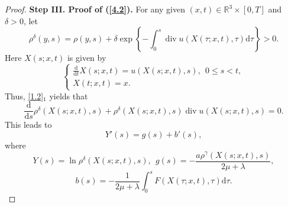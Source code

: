 \documentclass[11pt]{article}
\DeclareMathOperator{\divv}{div}
\begin{document}
\begin{proof}
{\bf Step III. Proof of (\ref{4.2}).}
For any given $(x,t) \in \mathbb{R}^3 \times [0,T]$ and $\delta>0$, let
$$
\rho^{\delta} (y,s) = \rho (y,s) + \delta \exp\left\{- \int^s_0 \divv u \left( X(\tau; x,t), \tau \right)\mathrm{d} \tau \right\} > 0.
$$
Here $X(s;x,t)$ is given by
$$
\begin{cases}
\frac{\mathrm{d}}{\mathrm{d} t} X (s;x,t) = u \left(X (s;x,t),s \right), \ \ 0 \leq s < t,\\
X(t;x,t) = x.
\end{cases}
$$
Thus, \eqref{1.2}$_1$ yields that
$$
\frac{\mathrm{d}}{\mathrm{d} s} \rho^{\delta} \left(X (s;x,t),s \right) + \rho^{\delta} \left(X (s;x,t),s \right) \divv u \left(X (s;x,t),s \right) = 0.
$$
This leads to
$$
Y'(s) = g(s) + b'(s),
$$
where
$$
Y (s) = \ln \rho^{\delta} \left(X (s;x,t),s \right), \ \ g(s) = - \frac{a \rho^{\gamma} \left(X (s;x,t),s \right)}{2 \mu + \lambda },
$$
$$
b(s) = - \frac{1}{2\mu + \lambda } \int^s_0 F \left(X (\tau;x,t),\tau \right) \mathrm{d} \tau.
$$


\end{proof}
\end{document}
